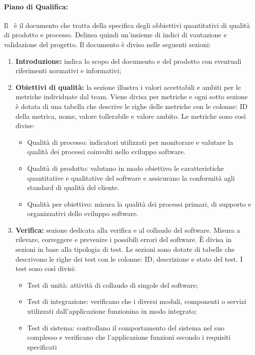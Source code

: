 \paragraph{Piano di Qualifica:}
Il \PdQ\ è il documento che tratta della specifica degli obbiettivi quantitativi di qualità di prodotto e processo. Delinea quindi un'insieme di indici di vautazione e validazione del progetto.
Il documento è diviso nelle seguenti sezioni:
\begin{enumerate}
  \item \textbf{Introduzione:} indica lo scopo del documento e del prodotto con eventuali riferimenti normativi e informativi;
  \item \textbf{Obiettivi di qualità:} la sezione illustra i valori accettabili e ambiti per le metriche individuate dal team. Viene divisa per metriche e ogni sotto sezione è dotata di una tabella che descrive le righe delle metriche con le colonne: ID della metrica, nome, valore tollerabile e valore ambito. Le metriche sono così divise:
  \begin{itemize}
    \item Qualità di processo: indicatori utilizzati per monitorare e valutare la qualità dei processi coinvolti nello sviluppo software. 
    \item Qualità di prodotto: valutano in modo obiettivo le caratteristiche quantitative e qualitative del software e assicurano la conformità agli standard di qualità del cliente.
    \item Qualità per obiettivo: misura la qualità dei processi primari, di supporto e organizzativi dello sviluppo software.
  \end{itemize}
  \item \textbf{Verifica:} sezione dedicata alla verifica e al collaudo del software. Misura a rilevare, correggere e prevenire i possibili errori del software. È divisa in sezioni in base alla tipologia di test. Le sezioni sono dotate di tabelle che descrivono le righe dei test con le colonne: ID, descrizione e stato del test. I test sono così divisi:
  \begin{itemize}
    \item Test di unità:  attività di collaudo di singole  del software;
    \item Test di integrazione: verificano che i diversi moduli, componenti o servizi utilizzati dall’applicazione funzionino in modo integrato;
    \item Test di sistema:  controllano il comportamento del sistema nel suo complesso e verificano che l’applicazione funzioni secondo i requisiti specificati

\end{itemize}
\end{enumerate}
